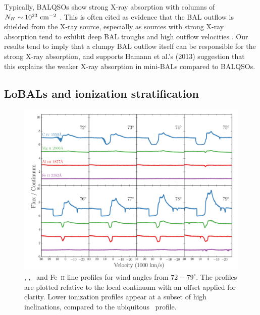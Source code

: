 \documentclass[useAMS,usenatbib]{mn2e_x}
\begin{document}
Typically, BALQSOs show strong X-ray absorption with columns 
of $N_H\sim10^{23}~\rm{cm^{-2}}$ 
\citep{green1996,mathur2000,green2001,grupemathur2003}.
This is often cited as evidence that the BAL outflow is shielded from
the X-ray source, especially as sources with strong X-ray absorption tend
to exhibit deep BAL troughs and high outflow velocities 
\citep{brandt2000,laorbrandt2002,gallagher2006}.
Our results tend to imply that a clumpy BAL outflow
itself can be responsible for the strong X-ray absorption, 
and supports Hamann et al.'s (2013) suggestion that 
this explains the weaker X-ray absorption in mini-BALs 
compared to BALQSOs.




\subsection{LoBALs and ionization stratification}

\begin{figure} %
\centering
\includegraphics[width=1.0\textwidth]{figures/c4_angles.png}
\caption
{
\civ , \mg , \al\ and Fe~\textsc{ii} line profiles for wind angles
from $72-79^\circ$. The profiles are plotted relative to the local
continuum with an offset applied for clarity. Lower ionization
profiles appear at a subset of high inclinations, compared
to the ubiquitous \civ\ profile.
}
\label{fig:lobal}
\end{figure} %
\end{document}
